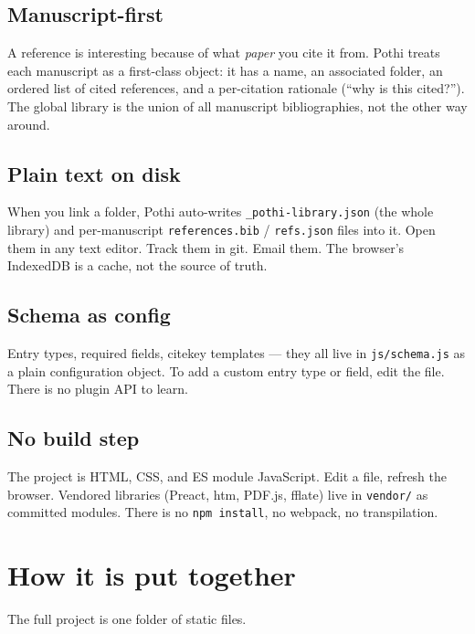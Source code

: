 \documentclass[11pt]{article}
\begin{document}
\subsection{Manuscript-first}

A reference is interesting because of what \emph{paper} you cite it from.
Pothi treats each manuscript as a first-class object: it has a name, an
associated folder, an ordered list of cited references, and a per-citation
rationale (``why is this cited?''). The global library is the union of all
manuscript bibliographies, not the other way around.

\subsection{Plain text on disk}

When you link a folder, Pothi auto-writes \verb|_pothi-library.json| (the
whole library) and per-manuscript \verb|references.bib| / \verb|refs.json|
files into it. Open them in any text editor. Track them in git. Email them.
The browser's IndexedDB is a cache, not the source of truth.

\subsection{Schema as config}

Entry types, required fields, citekey templates --- they all live in
\texttt{js/schema.js} as a plain configuration object. To add a custom entry
type or field, edit the file. There is no plugin API to learn.

\subsection{No build step}

The project is HTML, CSS, and ES module JavaScript. Edit a file, refresh the
browser. Vendored libraries (Preact, htm, PDF.js, fflate) live in
\texttt{vendor/} as committed modules. There is no \texttt{npm install}, no
webpack, no transpilation.

\section{How it is put together}

The full project is one folder of static files.
\end{document}
